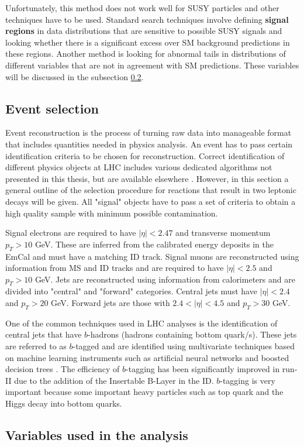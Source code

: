 Unfortunately, this method does not work well for SUSY particles and other techniques have to be used. Standard search techniques involve defining \textbf{signal regions} in data distributions that are sensitive to possible SUSY signals and looking whether there is a significant excess over SM background predictions in these regions. Another method is looking for abnormal tails in distributions of different variables that are not in agreement with SM predictions. These variables will be discussed in the subsection \ref{subsec:Variables}.

\subsection{Event selection}

Event reconstruction is the process of turning raw data into manageable format that includes quantities needed in physics analysis. An event has to pass certain identification criteria to be chosen for reconstruction. Correct identification of different physics objects at LHC includes various dedicated algorithms not presented in this thesis, but are available elsewhere \citep{Aad:2016tuk}. 
However, in this section a general outline of the selection procedure for reactions that result in two leptonic decays will be given. All "signal" objects have to pass a set of criteria to obtain a high quality sample with minimum possible contamination.

Signal electrons are required to have $|\eta|<2.47$ and transverse momentum $p_{T}>10$ GeV. These are inferred from the calibrated  energy deposits in the EmCal and must have a matching ID track. Signal muons are reconstructed using information from MS and ID tracks and are required to have   $|\eta|<2.5$ and $p_{T}>10$ GeV. Jets are reconstructed using information from calorimeters and are divided into "central" and "forward" categories. Central jets must have $|\eta|<2.4$ and $p_{T}>20$ GeV. Forward jets are those with $2.4<|\eta|<4.5$ and $p_{T}>30$ GeV. 

One of the common techniques used in LHC analyses is the identification of central jets that have $b$-hadrons (hadrons containing bottom quark/s).  These jets are referred to as $b$-tagged and are identified using multivariate techniques based on machine learning instruments such as artificial neural networks and boosted decision trees \citep{Aad:2015ydr}. The efficiency of $b$-tagging has been significantly improved in run-II due to the addition of the Insertable B-Layer in the ID. $b$-tagging is very important because some important heavy particles such as top quark and the Higgs decay into bottom quarks. 


\subsection{Variables used in the analysis}
\label{subsec:Variables}





 
